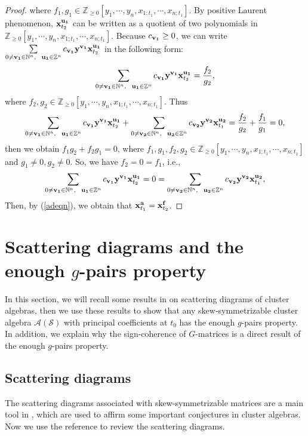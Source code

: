 \documentclass[14pt]{amsart}
\begin{document}
\begin{proof}
 where $f_1,g_1\in\mathbb Z_{\geq 0}[y_1,\cdots,y_n,x_{1;t_1},\cdots,x_{n;t_1}]$.
By positive Laurent phenomenon,  ${\bf x}_{t_2}^{\bf u_1}$ can be written as a quotient of two polynomials in $\mathbb Z_{\geq 0}[y_1,\cdots,y_n,x_{1;t_1},\cdots,x_{n;t_1}]$. Because $c_{\bf v_1}\geq 0$,  we can write  $\sum\limits_{0\neq {\bf v_1}\in\mathbb N^n,~~{\bf u_1}\in\mathbb Z^n}c_{\bf v_1}{\bf y}^{\bf v_1}{\bf x}_{t_2}^{\bf u_1}$ in the following form:
$$\sum\limits_{0\neq {\bf v_1}\in\mathbb N^n,~~{\bf u_1}\in\mathbb Z^n}c_{\bf v_1}{\bf y}^{\bf v_1}{\bf x}_{t_2}^{\bf u_1}=\frac{f_2}{g_2},$$
where $f_2,g_2\in\mathbb Z_{\geq0}[y_1,\cdots,y_n,x_{1;t_1},\cdots,x_{n;t_1}]$.
Thus
$$\sum\limits_{0\neq {\bf v_1}\in\mathbb N^n,~~{\bf u_1}\in\mathbb Z^n}c_{\bf v_1}{\bf y}^{\bf v_1}{\bf x}_{t_2}^{\bf u_1}+\sum\limits_{0\neq {\bf v_2}\in\mathbb N^n,~~{\bf u_2}\in\mathbb Z^n}c_{\bf v_2}{\bf y}^{\bf v_2}{\bf x}_{t_1}^{\bf u_2}=\frac{f_2}{g_2}+\frac{f_1}{g_1}=0,$$
then we obtain $f_1g_2+f_2g_1=0$, where $f_1,g_1,f_2,g_2\in\mathbb Z_{\geq0}[y_1,\cdots,y_n,x_{1;t_1},\cdots,x_{n;t_1}]$ and $g_1\neq0,g_2\neq0$.
So, we have $f_2=0=f_1$, i.e., $$\sum\limits_{0\neq {\bf v_1}\in\mathbb N^n,~~{\bf u_1}\in\mathbb Z^n}c_{\bf v_1}{\bf y}^{\bf v_1}{\bf x}_{t_2}^{\bf u_1}=0=\sum\limits_{0\neq {\bf v_2}\in\mathbb N^n,~~{\bf u_2}\in\mathbb Z^n}c_{\bf v_2}{\bf y}^{\bf v_2}{\bf x}_{t_1}^{\bf u_2},$$
Then, by (\ref{adeqn}), we obtain that ${\bf x}_{t_1}^{\bf a}={\bf x}_{t_2}^{\bf f}$.
\end{proof}

\vspace{5mm}






\section{Scattering diagrams and the enough $g$-pairs property}

In this section, we will recall some results in \cite{M,GHKK}  on scattering diagrams of cluster algebras, then we use these results to show that any skew-symmetrizable cluster algebra $\mathcal A(\mathcal S)$  with principal coefficients at $t_0$ has the enough $g$-pairs property. In addition, we explain why the sign-coherence of $G$-matrices is a direct result of the enough $g$-pairs property.

\subsection {Scattering diagrams}
The scattering diagrams  associated with  skew-symmetrizable matrices are a main tool in \cite{GHKK}, which are used to affirm some important conjectures in cluster algebras. Now we use the reference \cite{M} to review the  scattering diagrams.
\end{document}
